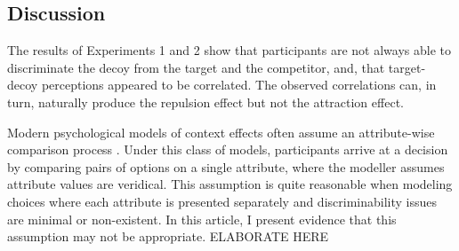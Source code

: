 \subsection{Discussion}

The results of Experiments 1 and 2 show that participants are not always able to discriminate the decoy from the target and the competitor, and, that target-decoy perceptions appeared to be correlated. The observed correlations can, in turn, naturally produce the repulsion effect but not the attraction effect. 


Modern psychological models of context effects often assume an attribute-wise comparison process \parencite{roeMultialternativeDecisionField2001a,trueblood2013not,usherLossAversionInhibition2004a,bhatiaAssociationsAccumulationPreference2013b}. Under this class of models, participants arrive at a decision by comparing pairs of options on a single attribute, where the modeller assumes attribute values are veridical. This assumption is quite reasonable when modeling choices where each attribute is presented separately and discriminability issues are minimal or non-existent. In this article, I present evidence that this assumption may not be appropriate. ELABORATE HERE